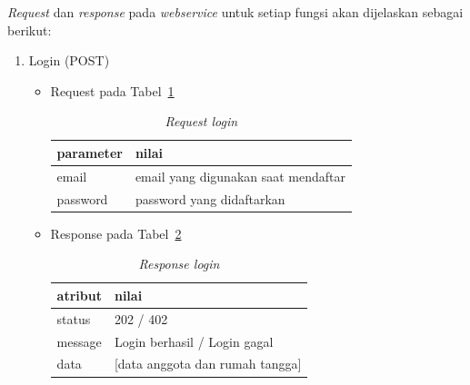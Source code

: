 \textit{Request} dan \textit{response} pada \textit{webservice} untuk setiap fungsi akan dijelaskan sebagai berikut:
\begin{enumerate}
	\item Login (POST)
		\begin{itemize}
			\item Request pada Tabel~\ref{tab:request_login}
				\begin{table}[h]
					\centering
						\begin{tabular}{ |p{4cm}|p{10cm}|}
							\hline
							parameter & nilai \\ \hline
							email & email yang digunakan saat mendaftar \\ \hline
							password & password yang didaftarkan \\ \hline
					\end{tabular}
					\caption{\textit{Request login}}
					\label{tab:request_login}
				\end{table}
			\item Response pada Tabel~\ref{tab:response_login}
				\begin{table}[h]
					\centering
						\begin{tabular}{ |p{4cm}|p{10cm}|}
							\hline
							atribut & nilai \\ \hline
							status & 202 / 402 \\ \hline
							message & Login berhasil / Login gagal \\ \hline
							data & [data anggota dan rumah tangga] \\ \hline
						\end{tabular}
						\caption{\textit{Response login}}
					\label{tab:response_login}
				\end{table}
		\end{itemize}
		

\end{enumerate}
